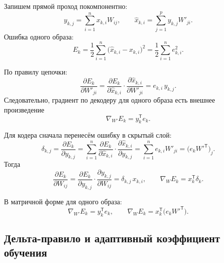 Запишем прямой проход покомпонентно:
\begin{equation}
	y_{k,j} = \sum_{i=1}^{n} x_{k,i} W_{ij}, \qquad
	\hat{x}_{k,i} = \sum_{j=1}^{p} y_{k,j} W'_{ji}.
	\label{eq:forward-comp}
\end{equation}
Ошибка одного образа:
\begin{equation}
	E_k = \frac{1}{2}\sum_{i=1}^{n}\bigl(\hat{x}_{k,i}-x_{k,i}\bigr)^2
	    = \frac{1}{2}\sum_{i=1}^{n} e_{k,i}^2 .
	\label{eq:ek}
\end{equation}

По правилу цепочки:
\begin{equation}
	\frac{\partial E_k}{\partial W'_{ji}}
	  = \frac{\partial E_k}{\partial \hat{x}_{k,i}}
	    \cdot \frac{\partial \hat{x}_{k,i}}{\partial W'_{ji}}
	  = e_{k,i}\,y_{k,j}.
	\label{eq:grad-wb}
\end{equation}
Следовательно, градиент по декодеру для одного образа есть внешнее произведение
\begin{equation}
	\nabla_{W'}E_k = y_k^{\mathsf{T}} e_k .
\end{equation}

Для кодера сначала перенесём ошибку в скрытый слой:
\begin{equation}
	\delta_{k,j} = \frac{\partial E_k}{\partial y_{k,j}}
	  = \sum_{i=1}^{n} \frac{\partial E_k}{\partial \hat{x}_{k,i}}
	    \cdot \frac{\partial \hat{x}_{k,i}}{\partial y_{k,j}}
	  = \sum_{i=1}^{n} e_{k,i} W'_{ji}
	  = \bigl(e_k W'^{\mathsf{T}}\bigr)_j .
	\label{eq:delta}
\end{equation}
Тогда
\begin{equation}
	\frac{\partial E_k}{\partial W_{ij}}
	  = \frac{\partial E_k}{\partial y_{k,j}}
	    \cdot \frac{\partial y_{k,j}}{\partial W_{ij}}
	  = \delta_{k,j}\,x_{k,i},
	\qquad
	\nabla_W E_k = x_k^{\mathsf{T}} \delta_k .
	\label{eq:grad-wf}
\end{equation}

В матричной форме для одного образа:
\begin{equation}
	\nabla_{W'}E_k = y_k^{\mathsf{T}} e_k, \qquad
	\nabla_W E_k = x_k^{\mathsf{T}} \bigl(e_k W'^{\mathsf{T}}\bigr).
	\label{eq:grads}
\end{equation}

\subsection{Дельта-правило и адаптивный коэффициент обучения}
\label{sec:theory-delta}

